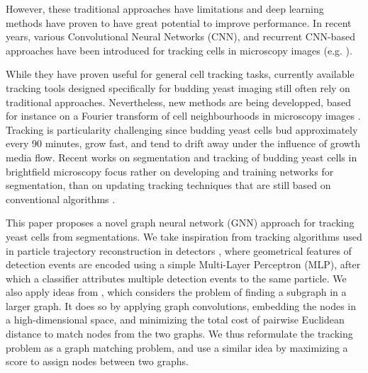 \documentclass[10pt,conference,compsocconf,a4paper]{IEEEtran}
\begin{document}
	However, these traditional approaches have limitations and deep learning methods have proven to have great potential to improve performance. In recent years, various Convolutional Neural Networks (CNN), and recurrent CNN-based approaches have been introduced for tracking cells in microscopy images (e.g. \cite{he,delta,payer,hayashida,moen}).

    While they have proven useful for general cell tracking tasks, currently available tracking tools designed specifically for budding yeast imaging still often rely on traditional approaches. Nevertheless, new methods are being developped, based for instance on a Fourier transform of cell neighbourhoods in microscopy images \cite{Cuny2022}.
	Tracking is particularity challenging since budding yeast cells bud approximately every 90 minutes, grow fast, and tend to drift away under the influence of growth media flow.
	Recent works on segmentation and tracking of budding yeast cells in brightfield microscopy focus rather on developing and training networks for segmentation, than on updating tracking techniques that are still based on conventional algorithms \cite{dietler_convolutional_2020,yeastnet,kruitbosch}.

    This paper proposes a novel graph neural network (GNN) approach for tracking yeast cells from segmentations. 
	We take inspiration from tracking algorithms used in particle trajectory reconstruction in detectors \cite{dezoort_charged_2021}, where geometrical features of detection events are encoded using a simple Multi-Layer Perceptron (MLP), after which a classifier attributes multiple detection events to the same particle. We also apply ideas from \cite{kipf_semi-supervised_2017}, which considers the problem of finding a subgraph in a larger graph. It does so by applying graph convolutions, embedding the nodes in a high-dimensional space, and minimizing the total cost of pairwise Euclidean distance to match nodes from the two graphs.
	We thus reformulate the tracking problem as a graph matching problem, and use a similar idea by maximizing a score to assign nodes between two graphs.

\end{document}
